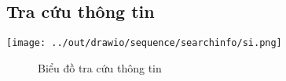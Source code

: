   \subsection*{Tra cứu thông tin}
    \begin{center}
      \texttt{[image: ../out/drawio/sequence/searchinfo/si.png]}
      \begin{figure}[h]
        \centering
        \caption{Biểu đồ tra cứu thông tin}
      \end{figure}
    \end{center}

